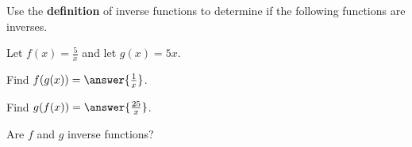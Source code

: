 \documentclass{ximera}
\author{Elizabeth Miller}
\begin{document}
\begin{exercise}

Use the \textbf{definition} of inverse functions to determine if the following functions are inverses.

Let $f(x)=\frac{5}{x}$ and let $g(x)=5x$.

Find $f(g(x))=\answer{\frac{1}{x}}$.

Find $g(f(x))=\answer{\frac{25}{x}}$.

Are $f$ and $g$ inverse functions?
 \begin{multipleChoice}
\end{multipleChoice}

\end{exercise}
\end{document}
